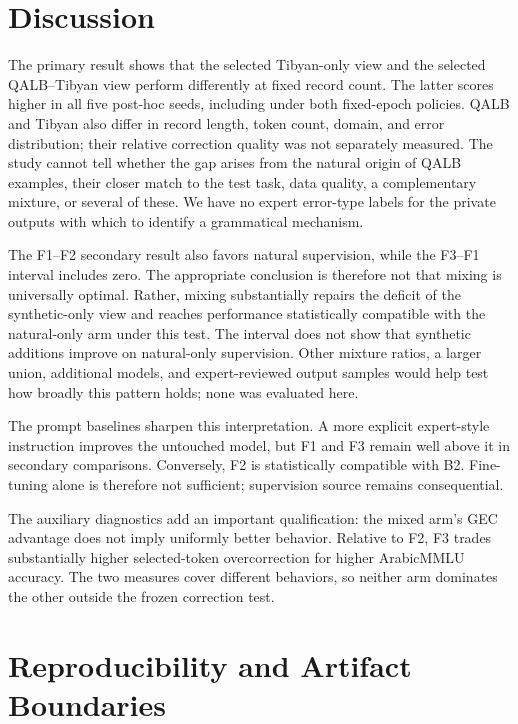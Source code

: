 \documentclass[11pt,a4paper]{article}
\begin{document}
\section{Discussion}

The primary result shows that the selected Tibyan-only view and the selected
QALB--Tibyan view perform differently at fixed record count.  The latter
scores higher in all five post-hoc seeds, including under both fixed-epoch
policies.  QALB and Tibyan also differ in record length, token count, domain,
and error distribution; their relative correction quality was not separately
measured.  The study cannot tell whether
the gap arises from the natural origin of QALB examples, their closer match
to the test task, data quality, a complementary mixture, or several of these.
We have no expert error-type labels for the private outputs with which to
identify a grammatical mechanism.

The F1--F2 secondary result also favors natural supervision, while the F3--F1
interval includes zero.  The appropriate conclusion is therefore not that
mixing is universally optimal.  Rather, mixing substantially repairs the
deficit of the synthetic-only view and reaches performance statistically
compatible with the natural-only arm under this test.  The interval does not
show that synthetic additions improve on natural-only supervision.  Other
mixture ratios, a larger union, additional models, and expert-reviewed output
samples would help test how broadly this pattern holds; none was evaluated
here.

The prompt baselines sharpen this interpretation.  A more explicit
expert-style instruction improves the untouched model, but F1 and F3 remain
well above it in secondary comparisons.  Conversely, F2 is statistically
compatible with B2.  Fine-tuning alone is therefore not sufficient;
supervision source remains consequential.

The auxiliary diagnostics add an important qualification: the mixed arm's GEC
advantage does not imply uniformly better behavior.  Relative to F2, F3 trades
substantially higher selected-token overcorrection for higher ArabicMMLU
accuracy.  The two measures cover different behaviors, so neither arm dominates
the other outside the frozen correction test.

\section{Reproducibility and Artifact Boundaries}
\end{document}
